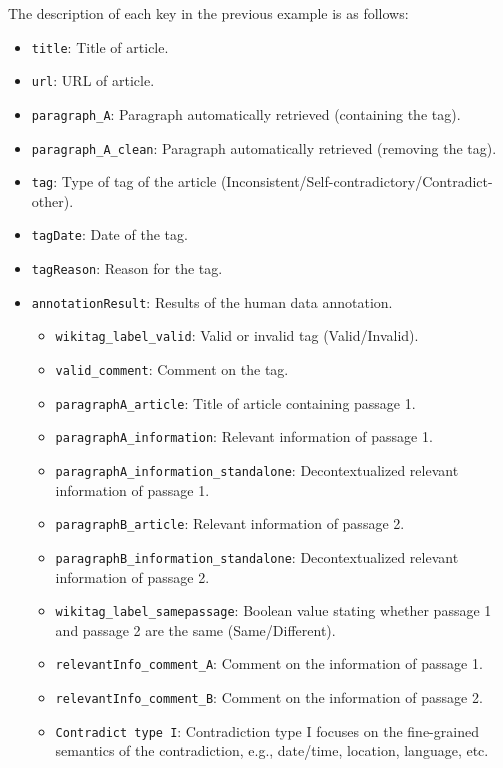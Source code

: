 \documentclass{article}
\begin{document}
The description of each key in the previous example is as follows:

\begin{itemize}
    \item \texttt{title}: Title of article.
    \item \texttt{url}: URL of article.
    \item \texttt{paragraph\_A}: Paragraph automatically retrieved (containing the tag).
    \item \texttt{paragraph\_A\_clean}: Paragraph automatically retrieved (removing the tag).
    \item \texttt{tag}: Type of tag of the article (Inconsistent/Self-contradictory/Contradict-other). 
    \item \texttt{tagDate}: Date of the tag.
    \item \texttt{tagReason}: Reason for the tag.
    \item  \texttt{annotationResult}: Results of the human data annotation.
    \begin{itemize}
        \item \texttt{wikitag\_label\_valid}: Valid or invalid tag (Valid/Invalid).
        \item \texttt{valid\_comment}: Comment on the tag.
        \item \texttt{paragraphA\_article}: Title of article containing passage 1.
        \item \texttt{paragraphA\_information}: Relevant information of passage 1.
        \item \texttt{paragraphA\_information\_standalone}: Decontextualized relevant information of passage 1.
        \item \texttt{paragraphB\_article}: Relevant information of passage 2.
        \item \texttt{paragraphB\_information\_standalone}: Decontextualized relevant information of passage 2.
        \item \texttt{wikitag\_label\_samepassage}: Boolean value stating whether passage 1 and passage 2 are the same (Same/Different).
        \item \texttt{relevantInfo\_comment\_A}: Comment on the information of passage 1.
        \item \texttt{relevantInfo\_comment\_B}: Comment on the information of passage 2.
        \item \texttt{Contradict type I}: Contradiction type I focuses on the fine-grained semantics of the contradiction, e.g., date/time, location, language, etc. 

\end{itemize}
\end{itemize}
\end{document}
